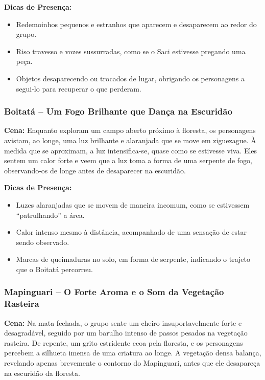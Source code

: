 \textbf{Dicas de Presença:}  
\begin{itemize}
    \item Redemoinhos pequenos e estranhos que aparecem e desaparecem ao redor do grupo.
    \item Riso travesso e vozes sussurradas, como se o Saci estivesse pregando uma peça.
    \item Objetos desaparecendo ou trocados de lugar, obrigando os personagens a segui-lo para recuperar o que perderam.
\end{itemize}

\subsubsection{Boitatá – Um Fogo Brilhante que Dança na Escuridão}

\textbf{Cena:} Enquanto exploram um campo aberto próximo à floresta, os personagens avistam, ao longe, uma luz brilhante e alaranjada que se move em ziguezague. À medida que se aproximam, a luz intensifica-se, quase como se estivesse viva. Eles sentem um calor forte e veem que a luz toma a forma de uma serpente de fogo, observando-os de longe antes de desaparecer na escuridão.

\textbf{Dicas de Presença:}  
\begin{itemize}
    \item Luzes alaranjadas que se movem de maneira incomum, como se estivessem “patrulhando” a área.
    \item Calor intenso mesmo à distância, acompanhado de uma sensação de estar sendo observado.
    \item Marcas de queimaduras no solo, em forma de serpente, indicando o trajeto que o Boitatá percorreu.
\end{itemize}

\subsubsection{Mapinguari – O Forte Aroma e o Som da Vegetação Rasteira}

\textbf{Cena:} Na mata fechada, o grupo sente um cheiro insuportavelmente forte e desagradável, seguido por um barulho intenso de passos pesados na vegetação rasteira. De repente, um grito estridente ecoa pela floresta, e os personagens percebem a silhueta imensa de uma criatura ao longe. A vegetação densa balança, revelando apenas brevemente o contorno do Mapinguari, antes que ele desapareça na escuridão da floresta.


